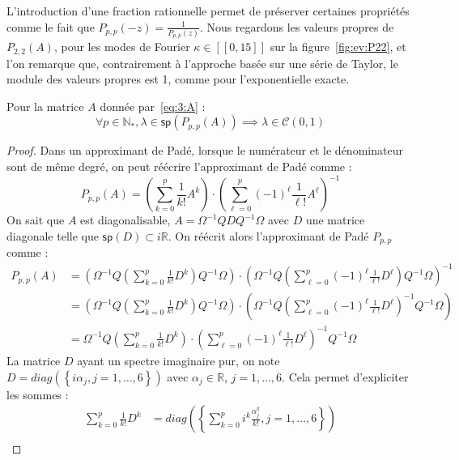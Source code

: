 L'introduction d'une fraction rationnelle permet de préserver certaines propriétés comme le fait que $P_{p,p}(-z) = \frac{1}{P_{p,p}(z)}$. Nous regardons les valeurs propres de $P_{2,2}(A)$, pour les modes de Fourier $\kappa\in[\![0,15]\!]$ sur la figure~\ref{fig:ev:P22}, et l'on remarque que, contrairement à l'approche basée sur une série de Taylor, le module des valeurs propres est 1, comme pour l'exponentielle exacte.

\begin{pro}
  Pour la matrice $A$ donnée par~\eqref{eq:3:A} :
  $$
    \forall p\in\mathbb{N}_*, \lambda\in\textsf{sp}(P_{p,p}(A)) \implies \lambda\in\mathcal{C}(0,1)
  $$
\end{pro}

\begin{proof}
  Dans un approximant de Padé, lorsque le numérateur et le dénominateur sont de même degré, on peut réécrire l'approximant de Padé comme :
  $$
    P_{p,p}(A) = \left( \sum_{k=0}^p \frac{1}{k!}A^k \right)\cdot\left( \sum_{\ell=0}^p (-1)^\ell\frac{1}{\ell!}A^\ell \right)^{-1}
  $$
  On sait que $A$ est diagonalisable, $A=\Omega^{-1}Q D Q^{-1}\Omega$ avec $D$ une matrice diagonale telle que $\mathsf{sp}(D)\subset i\mathbb{R}$. On réécrit alors l'approximant de Padé $P_{p,p}$ comme :
  $$
    \begin{aligned}
      P_{p,p}(A) &= \left( \Omega^{-1}Q \left( \sum_{k=0}^p \frac{1}{k!}D^k \right) Q^{-1}\Omega \right)
                      \cdot
                    \left( \Omega^{-1}Q \left(\sum_{\ell=0}^p (-1)^\ell \frac{1}{\ell!}D^\ell \right) Q^{-1}\Omega \right)^{-1} \\
                 &= \left( \Omega^{-1}Q \left( \sum_{k=0}^p \frac{1}{k!}D^k \right) Q^{-1}\Omega \right)
                      \cdot
                    \left( \Omega^{-1}Q \left(\sum_{\ell=0}^p (-1)^\ell \frac{1}{\ell!}D^\ell \right)^{-1} Q^{-1}\Omega \right) \\
                 &= \Omega^{-1}Q \left( \sum_{k=0}^p \frac{1}{k!}D^k \right) \cdot \left(\sum_{\ell=0}^p (-1)^\ell \frac{1}{\ell!}D^\ell \right)^{-1} Q^{-1}\Omega
    \end{aligned}
  $$
  La matrice $D$ ayant un spectre imaginaire pur, on note $D = diag\left(\left\{ i\alpha_j, j=1,\dots,6 \right\}\right)$ avec $\alpha_j\in\mathbb{R}$, $j=1,\dots,6$. Cela permet d'expliciter les sommes :
  $$
    \begin{aligned}
      \sum_{k=0}^p \frac{1}{k!}D^k & = diag\left(\left\{ \sum_{k=0}^p i^k\frac{\alpha_j^k}{k!} , j=1,\dots,6 \right\}\right) \\

\end{aligned}$$
\end{proof}
